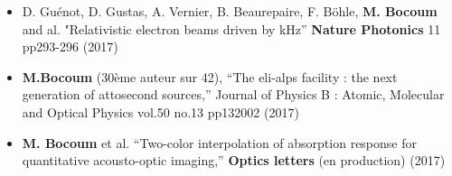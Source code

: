 \documentclass[10pt,a4paper,sans]{moderncv} %
\begin{document}
\begin{itemize}
\item  D. Guénot, D. Gustas, A. Vernier, B. Beaurepaire, F. Böhle, \textbf{M. Bocoum} and al. "Relativistic electron beams driven by kHz” \textbf{Nature Photonics} 11 pp293-296 (2017)

\item \textbf{M.Bocoum} (30ème auteur sur 42), “The eli-alps facility : the next generation of attosecond sources,” Journal of Physics B : Atomic, Molecular and Optical Physics vol.50 no.13 pp132002 (2017)

\item  \textbf{M. Bocoum} et al. “Two-color interpolation of absorption response for quantitative acousto-optic imaging,” \textbf{Optics letters} (en production) (2017)

\end{itemize}


\end{document}
